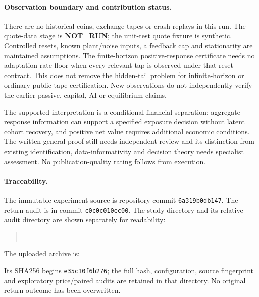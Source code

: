 \paragraph{Observation boundary and contribution status.}
There are no historical coins, exchange tapes or crash replays in this run.
The quote-data stage is \textbf{NOT\_RUN}; the unit-test quote fixture is
synthetic. Controlled resets, known plant/noise inputs, a feedback cap and
stationarity are maintained assumptions. The finite-horizon positive-response
certificate needs no adaptation-rate floor when every relevant tap is observed
under that reset contract. This does not remove the hidden-tail problem for
infinite-horizon or ordinary public-tape certification. New observations do not
independently verify the earlier passive, capital, AI or equilibrium claims.

The supported interpretation is a conditional financial separation: aggregate
response information can support a specified exposure decision without latent
cohort recovery, and positive net value requires additional economic conditions.
The written general proof still needs independent review and its distinction
from existing identification, data-informativity and decision theory needs
specialist assessment. No publication-quality rating follows from execution.

\paragraph{Traceability.}
The immutable experiment source is repository commit \texttt{6a319b0db147}.
The return audit is in commit \texttt{c0c0c010ec00}. The study directory and
its relative audit directory are shown separately for readability:
\begin{quote}\footnotesize
{}\\
\end{quote}
The uploaded archive is:
\begin{quote}\footnotesize
{}
\end{quote}
Its SHA256 begins \texttt{e35c10f6b276}; the full hash, configuration, source
fingerprint and exploratory price/paired audits are retained in that directory.
No original return outcome has been overwritten.
\endgroup
